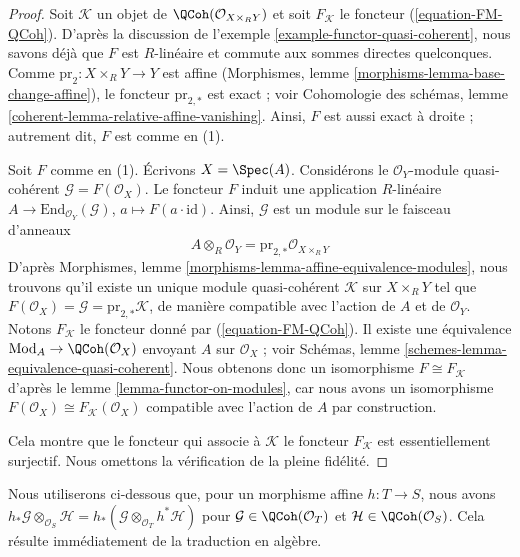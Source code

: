 \begin{proof}
Soit $\mathcal{K}$ un objet de $\QCoh(\mathcal{O}_{X \times_R Y})$
et soit $F_\mathcal{K}$ le foncteur (\ref{equation-FM-QCoh}). D'après la discussion de
l'exemple \ref{example-functor-quasi-coherent}, nous savons déjà que
$F$ est $R$-linéaire et commute aux sommes directes quelconques.
Comme $\text{pr}_2 : X \times_R Y \to Y$ est affine
(Morphismes, lemme \ref{morphisms-lemma-base-change-affine}), le foncteur
$\text{pr}_{2, *}$ est exact ; voir Cohomologie des schémas, lemme
\ref{coherent-lemma-relative-affine-vanishing}.
Ainsi, $F$ est aussi exact à droite ; autrement dit, $F$ est comme en (1).

\medskip\noindent
Soit $F$ comme en (1). Écrivons $X = \Spec(A)$. Considérons le
$\mathcal{O}_Y$-module quasi-cohérent $\mathcal{G} = F(\mathcal{O}_X)$.
Le foncteur $F$ induit une application $R$-linéaire
$A \to \text{End}_{\mathcal{O}_Y}(\mathcal{G})$,
$a \mapsto F(a \cdot \text{id})$. Ainsi, $\mathcal{G}$ est un module sur le faisceau d'anneaux
$$
A \otimes_R \mathcal{O}_Y = \text{pr}_{2, *}\mathcal{O}_{X \times_R Y}
$$
D'après Morphismes, lemme \ref{morphisms-lemma-affine-equivalence-modules},
nous trouvons qu'il existe un unique module quasi-cohérent $\mathcal{K}$
sur $X \times_R Y$ tel que $F(\mathcal{O}_X) = \mathcal{G} =
\text{pr}_{2, *}\mathcal{K}$, de manière compatible avec l'action
de $A$ et de $\mathcal{O}_Y$. Notons $F_\mathcal{K}$ le foncteur
donné par (\ref{equation-FM-QCoh}). Il existe une équivalence
$\text{Mod}_A \to \QCoh(\mathcal{O}_X)$ envoyant $A$ sur $\mathcal{O}_X$ ; voir
Schémas, lemme \ref{schemes-lemma-equivalence-quasi-coherent}.
Nous obtenons donc un isomorphisme $F \cong F_\mathcal{K}$ d'après le
lemme \ref{lemma-functor-on-modules}, car nous avons un isomorphisme
$F(\mathcal{O}_X) \cong F_\mathcal{K}(\mathcal{O}_X)$ compatible avec
l'action de $A$ par construction.

\medskip\noindent
Cela montre que le foncteur qui associe à $\mathcal{K}$ le foncteur $F_\mathcal{K}$
est essentiellement surjectif. Nous omettons la vérification de la pleine fidélité.
\end{proof}

\begin{remark}
\label{remark-affine-morphism}
Nous utiliserons ci-dessous que, pour un morphisme affine
$h : T \to S$, nous avons $h_*\mathcal{G} \otimes_{\mathcal{O}_S} \mathcal{H} =
h_*(\mathcal{G} \otimes_{\mathcal{O}_T} h^*\mathcal{H})$ pour
$\mathcal{G} \in \QCoh(\mathcal{O}_T)$ et
$\mathcal{H} \in \QCoh(\mathcal{O}_S)$. Cela résulte
immédiatement de la traduction en algèbre.
\end{remark}

